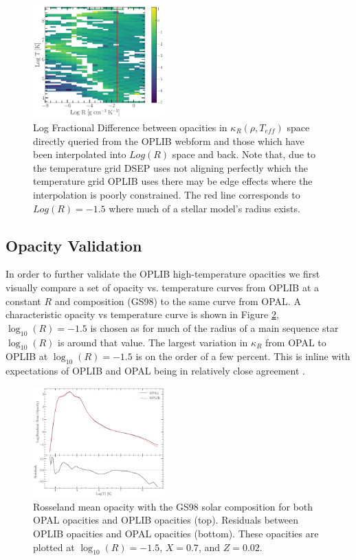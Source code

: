 \begin{figure}
	\centering
	\includegraphics[width=0.45\textwidth]{src/figures/FractionalDifference.pdf}
	\caption{Log Fractional Difference between opacities in $\kappa_{R}(\rho,
	T_{eff})$ space directly queried from the OPLIB webform and those which
	have been interpolated into $Log(R)$ space and back. Note that, due to the
	temperature grid DSEP uses not aligning perfectly which the temperature
	grid OPLIB uses there may be edge effects where the interpolation is poorly
	constrained. The red line corresponds to $Log(R) = -1.5$ where much of a
	stellar model's radius exists.}
	\label{fig:fracdiff}
\end{figure}

\subsection{Opacity Validation}
In order to further validate the OPLIB high-temperature opacities we first visually
compare a set of opacity vs. temperature curves from OPLIB at a constant $R$
and \citet{Grevesse1998} composition (GS98) to the same curve from OPAL. A
characteristic opacity vs temperature curve is shown in Figure
\ref{fig:OpacCompare}, $\log _{10}(R) = -1.5$ is chosen as for much of the
radius of a main sequence star $\log _{10}(R)$ is around that value. The
largest variation in $\kappa_{R}$ from OPAL to OPLIB at $\log _{10}(R)=-1.5$ is
on the order of a few percent. This is inline with expectations of OPLIB and OPAL
being in relatively close agreement \citep{Colgan2016}.

\begin{figure}
	\centering
	\includegraphics[width=0.45\textwidth]{src/figures/OpacityComparision.pdf}
	\caption{Rosseland mean opacity with the GS98 solar composition for both
		OPAL opacities and OPLIB opacities (top). Residuals between OPLIB
		opacities and OPAL opacities (bottom). These opacities are plotted at
		$\log _{10}(R) = -1.5$, $X=0.7$, and $Z=0.02$.}
	\label{fig:OpacCompare}
\end{figure}

